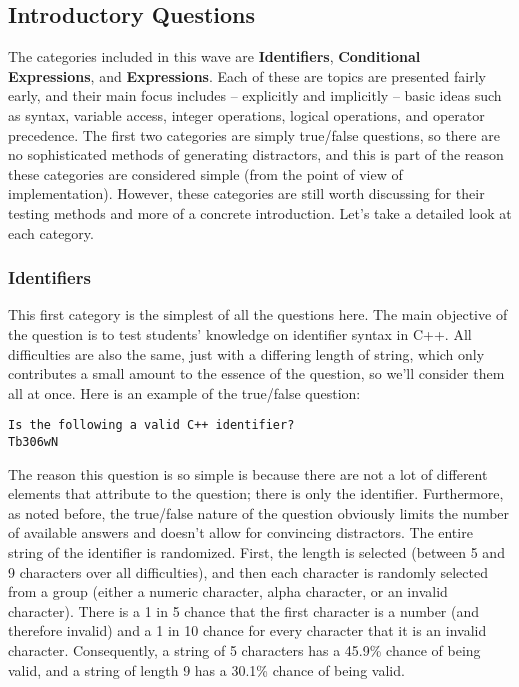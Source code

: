 \documentclass{article}
\begin{document}
\subsection{Introductory Questions} \label{subsec-introductory_questions}
The categories included in this wave are \textbf{Identifiers}, \textbf{Conditional Expressions}, and \textbf{Expressions}. Each of these are topics are presented fairly early, and their main
focus includes -- explicitly and implicitly -- basic ideas such as syntax, variable access, integer operations, logical operations, and operator precedence.
The first two categories are simply true/false questions, so there are no sophisticated methods of generating
distractors, and this is part of the reason these categories are considered simple (from the point of view of implementation). However, these categories are still
worth discussing for their testing methods and more of a concrete introduction. Let's take a detailed look at each category.

\subsubsection{Identifiers} \label{subsubsec-identifiers}

This first category is the simplest of all the questions here. The main objective of the question is to test students' knowledge on identifier syntax in C++.
All difficulties are also the same, just with a differing length of string, which only contributes a small amount to the essence of the question, so we'll consider
them all at once.
Here is an example of the true/false question:

\begin{lstlisting}[caption={A question on identifiers.}, label=lst-identifiers]
Is the following a valid C++ identifier?
Tb306wN 
\end{lstlisting}


The reason this question is so simple is because there are not a lot of different elements that attribute to the question; there is only the identifier.
Furthermore, as noted before, the true/false nature of the question obviously limits the number of available answers and doesn't allow for convincing distractors.
The entire string of the identifier is randomized. First, the length is selected (between 5 and 9 characters over all difficulties), and then each character is randomly selected from
a group (either a numeric character, alpha character, or an invalid character). There is a 1 in 5 chance that the first character is a number (and therefore invalid)
and a 1 in 10 chance for every character that it is an invalid character. Consequently, a string of 5 characters has a 45.9\% chance of being valid, and a string of
length 9 has a 30.1\% chance of being valid.
\end{document}
